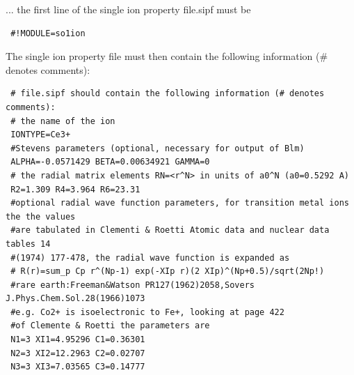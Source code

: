 \begin{description}
\begin{description}
 ... the first line of the single ion property file.sipf must be
\begin{verbatim}
 #!MODULE=so1ion
\end{verbatim}
The single ion property file must then contain the following
                      information (\# denotes comments):
\begin{verbatim}
 # file.sipf should contain the following information (# denotes comments):
 # the name of the ion
 IONTYPE=Ce3+
 #Stevens parameters (optional, necessary for output of Blm)
 ALPHA=-0.0571429 BETA=0.00634921 GAMMA=0
 # the radial matrix elements RN=<r^N> in units of a0^N (a0=0.5292 A)
 R2=1.309 R4=3.964 R6=23.31
 #optional radial wave function parameters, for transition metal ions the the values
 #are tabulated in Clementi & Roetti Atomic data and nuclear data tables 14 
 #(1974) 177-478, the radial wave function is expanded as
 # R(r)=sum_p Cp r^(Np-1) exp(-XIp r)(2 XIp)^(Np+0.5)/sqrt(2Np!)
 #rare earth:Freeman&Watson PR127(1962)2058,Sovers J.Phys.Chem.Sol.28(1966)1073
 #e.g. Co2+ is isoelectronic to Fe+, looking at page 422
 #of Clemente & Roetti the parameters are 
 N1=3 XI1=4.95296 C1=0.36301 
 N2=3 XI2=12.2963 C2=0.02707 
 N3=3 XI3=7.03565 C3=0.14777
\end{verbatim}
\end{description}


\end{description}
